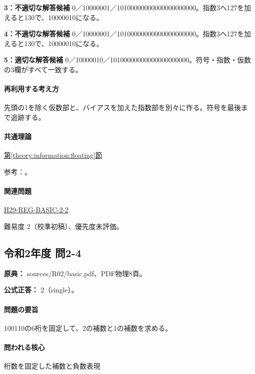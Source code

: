 \noindent\textbf{3：不適切な解答候補} 0／10000001／10100000000000000000000。指数3へ127を加えると130で、10000010になる。\par

\noindent\textbf{4：不適切な解答候補} 0／10000001／10100000000000000000000。指数3へ127を加えると130で、10000010になる。\par

\noindent\textbf{5：適切な解答候補} 0／10000010／10100000000000000000000。符号・指数・仮数の3欄がすべて一致する。\par

\paragraph{再利用する考え方} 先頭の1を除く仮数部と、バイアスを加えた指数部を別々に作る。符号を最後まで追跡する。

\paragraph{共通理論} \hyperref[theory:information:floating]{第\ref*{theory:information:floating}節}

\par 参考：\cite{oracle_single}。

\paragraph{関連問題} \hyperref[q:h29-reg-basic-2-2]{H29-REG-BASIC-2-2}

\par 難易度 2（校準初稿）、優先度未評価。

\subsection{令和2年度 問2-4}
\label{q:r02-reg-basic-2-4}

\noindent\textbf{原典：} sources/R02/basic.pdf、PDF物理8頁。

\textbf{公式正答：} 2（single）。

\paragraph{問題の要旨} 100110の6桁を固定して、2の補数と1の補数を求める。

\paragraph{問われる核心} 桁数を固定した補数と負数表現

